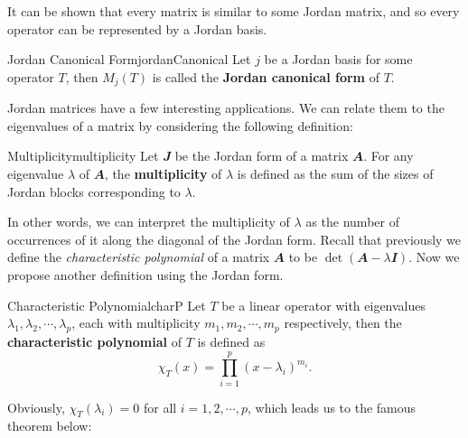 \documentclass[math, code]{amznotes}
\theoremstyle{remark}
\begin{document}
It can be shown that every matrix is similar to some Jordan matrix, and so every operator can be represented by a Jordan basis.
\begin{dfnbox}{Jordan Canonical Form}{jordanCanonical}
    Let $j$ be a Jordan basis for some operator $T$, then $M_j(T)$ is called the {\color{red} \textbf{Jordan canonical form}} of $T$.
\end{dfnbox}
Jordan matrices have a few interesting applications. We can relate them to the eigenvalues of a matrix by considering the following definition:
\begin{dfnbox}{Multiplicity}{multiplicity}
    Let $\mathbfit{J}$ be the Jordan form of a matrix $\mathbfit{A}$. For any eigenvalue $\lambda$ of $\mathbfit{A}$, the {\color{red} \textbf{multiplicity}} of $\lambda$ is defined as the sum of the sizes of Jordan blocks corresponding to $\lambda$.
\end{dfnbox}
In other words, we can interpret the multiplicity of $\lambda$ as the number of occurrences of it along the diagonal of the Jordan form. Recall that previously we define the \textit{characteristic polynomial} of a matrix $\mathbfit{A}$ to be $\det(\mathbfit{A} - \lambda\mathbfit{I})$. Now we propose another definition using the Jordan form.
\begin{dfnbox}{Characteristic Polynomial}{charP}
    Let $T$ be a linear operator with eigenvalues $\lambda_1, \lambda_2, \cdots, \lambda_p$, each with multiplicity $m_1, m_2, \cdots, m_p$ respectively, then the {\color{red} \textbf{characteristic polynomial}} of $T$ is defined as 
    \begin{equation*}
        \chi_T(x) = \prod_{i = 1}^{p}(x - \lambda_i)^{m_i}.
    \end{equation*}
\end{dfnbox}
Obviously, $\chi_T(\lambda_i) = 0$ for all $i = 1, 2, \cdots, p$, which leads us to the famous theorem below:
\end{document}
